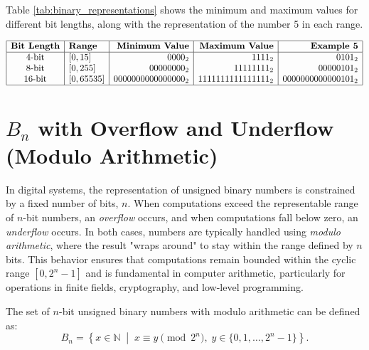 Table \ref{tab:binary_representations} shows the minimum and maximum values for different bit lengths, along with the representation of the number 5 in each range.

\begin{table}[h!]
\centering
\caption{Binary Representations for Different Bit Lengths}
\label{tab:binary_representations}
\[
\begin{array}{|c|l|r|r|r|}
\hline
\textbf{Bit Length} & \textbf{Range} & \textbf{Minimum Value} & \textbf{Maximum Value} & \textbf{Example 5} \\
\hline
4\text{-bit}  & [0, 15]            & 0000_2 & 1111_2  & 0101_2 \\
8\text{-bit}  & [0, 255]           & 00000000_2 & 11111111_2 & 00000101_2 \\
16\text{-bit} & [0, 65535]         & 0000000000000000_2 & 1111111111111111_2 & 0000000000000101_2 \\
\hline
\end{array}
\]
\end{table}

\section{\( B_n \) with Overflow and Underflow (Modulo Arithmetic)}
In digital systems, the representation of unsigned binary numbers is constrained by a fixed number of bits, \( n \). When computations exceed the representable range of \( n \)-bit numbers, an \textit{overflow} occurs, and when computations fall below zero, an \textit{underflow} occurs. In both cases, numbers are typically handled using \textit{modulo arithmetic}, where the result "wraps around" to stay within the range defined by \( n \) bits. This behavior ensures that computations remain bounded within the cyclic range \( [0, 2^n - 1] \) and is fundamental in computer arithmetic, particularly for operations in finite fields, cryptography, and low-level programming.



The set of \( n \)-bit unsigned binary numbers with modulo arithmetic can be defined as:
\[
B_n = \left\{ x \in \mathbb{N} \; \middle| \; x \equiv y \pmod{2^n}, \; y \in \{0, 1, \dots, 2^n - 1\} \right\}.
\]

